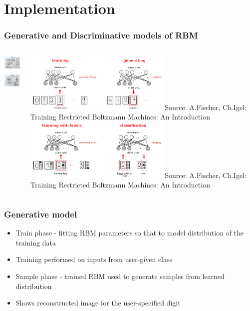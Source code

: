 \documentclass{beamer}
\begin{document}
  \section{Implementation}
  \begin{frame}
  \frametitle{Generative and Discriminative models of RBM}
  \begin{columns}
        \begin{column}{0.3\textwidth}
            \includegraphics[width=3cm]{images/classDiagram.png}
        \end{column}
        \begin{column}{0.7\textwidth}
			\centering
			\includegraphics[width = 7cm]{images/generativeRBM.png}
			{\TINY Source: A.Fischer, Ch.Igel: Training Restricted Boltzmann Machines: An Introduction}
			\includegraphics[width = 7cm]{images/DRBM.png}
			{\TINY Source: A.Fischer, Ch.Igel: Training Restricted Boltzmann Machines: An Introduction}
        \end{column}
    \end{columns}
  \end{frame}
   \begin{frame}
    \frametitle{Generative model}
    \begin{itemize}
	\item Train phase - fitting RBM parameters so that to model distribution of the training data 
	\item Training performed on inputs from user-given class
	\item Sample phase - trained RBM used to generate samples from learned distribution
	\item Shows reconstructed image for the user-specified digit
	\end{itemize}
	\end{frame}
\end{document}
